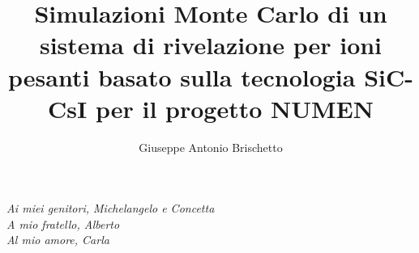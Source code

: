 \documentclass[MSc,italian]{dfaunictthesis}
\begin{document}
\author{Giuseppe Antonio Brischetto}
\title{Simulazioni Monte Carlo di un sistema di rivelazione per ioni pesanti basato sulla tecnologia SiC-CsI per il progetto NUMEN}

\begin{supervisors}
\end{supervisors}


\maketitlepage

\thispagestyle{empty}
\cleardoublepage


\begin{flushright}
	\null {}
	\textit{Ai miei genitori, Michelangelo e Concetta\\}
	\textit{A mio fratello, Alberto\\}
    \textit{Al mio amore, Carla}
     \null
\end{flushright}

\thispagestyle{empty}
\newpage

\thispagestyle{empty}
\cleardoublepage
\tableofcontents

\cleardoublepage
{}
{}
\chapter*{}





\end{document}
